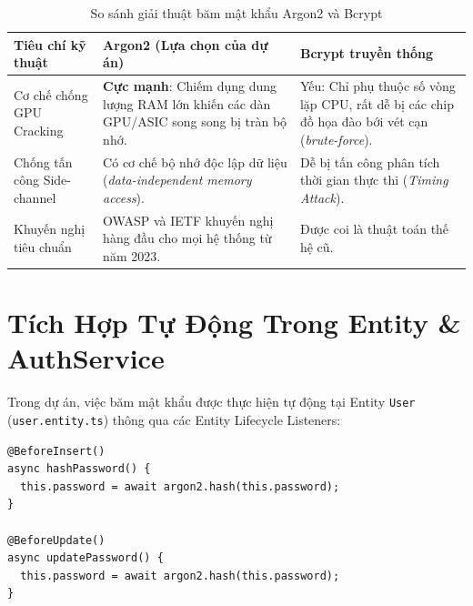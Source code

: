 \documentclass[12pt,a4paper,oneside]{book}
\begin{document}
\begin{table}[htbp]
  \centering
  \small
  \caption{So sánh giải thuật băm mật khẩu Argon2 và Bcrypt}
  \label{tab:argon2-vs-bcrypt-pedagogy}
  \begin{tabularx}{\textwidth}{l p{4.5cm} X}
    \toprule
    \textbf{Tiêu chí kỹ thuật} & \textbf{Argon2 (Lựa chọn của dự án)} & \textbf{Bcrypt truyền thống} \\
    \midrule
    Cơ chế chống GPU Cracking & \textbf{Cực mạnh}: Chiếm dụng dung lượng RAM lớn khiến các dàn GPU/ASIC song song bị tràn bộ nhớ. & Yếu: Chỉ phụ thuộc số vòng lặp CPU, rất dễ bị các chip đồ họa đào bới vét cạn (\textit{brute-force}). \\
    Chống tấn công Side-channel & Có cơ chế bộ nhớ độc lập dữ liệu (\textit{data-independent memory access}). & Dễ bị tấn công phân tích thời gian thực thi (\textit{Timing Attack}). \\
    Khuyến nghị tiêu chuẩn & OWASP và IETF khuyến nghị hàng đầu cho mọi hệ thống từ năm 2023. & Được coi là thuật toán thế hệ cũ. \\
    \bottomrule
  \end{tabularx}
\end{table}

\section{Tích Hợp Tự Động Trong Entity \& AuthService}
Trong dự án, việc băm mật khẩu được thực hiện tự động tại Entity \texttt{User} (\texttt{user.entity.ts}) thông qua các Entity Lifecycle Listeners:

\begin{codebox}
\begin{Verbatim}[fontsize=\small]
@BeforeInsert()
async hashPassword() {
  this.password = await argon2.hash(this.password);
}

@BeforeUpdate()
async updatePassword() {
  this.password = await argon2.hash(this.password);
}
\end{Verbatim}
\end{codebox}
\end{document}

